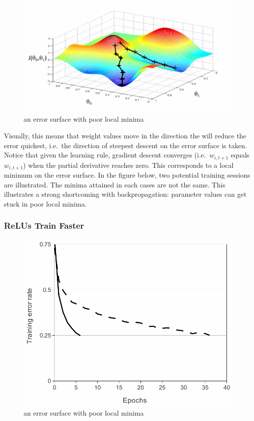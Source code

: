 \documentclass[a4paper,11pt]{article}
\begin{document}
\begin{figure}[h!]
	\centering
	\includegraphics[scale=0.8]{images/local_minima.png}
	\caption{an error surface with poor local minima}
\end{figure}

Visually, this means that weight values move in the direction the will reduce the error quickest, i.e.\ the direction of steepest descent on the error surface is taken. Notice that given the learning rule, gradient descent converges (i.e.\ $w_{i,t+1}$ equals $w_{i,t+1}$) when the partial derivative reaches zero. This corresponds to a local minimum on the error surface. In the figure below, two potential training sessions are illustrated. The minima attained in each cases are not the same. This illustrates a strong shortcoming with backpropagation: parameter values can get stuck in poor local minima.


\subsubsection{ReLUs Train Faster}

\begin{figure}[h!]
	\centering
	\includegraphics[scale=0.3]{images/ReLU_train_fast.png}
	\caption{an error surface with poor local minima}
\end{figure}
\end{document}
